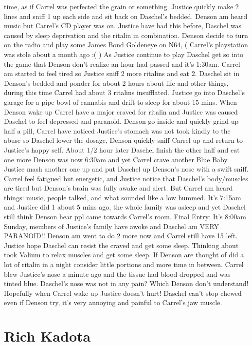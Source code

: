 \documentclass[12pt]{book}
\begin{document}
time, as if Carrel was perfected the grain or something. Justice quickly make 2 lines and sniff 1 up each side and sit back on Daschel's bedded. Denson am heard music but Carrel's CD player was on. Justice have had this before, Daschel was caused by sleep deprivation and the ritalin in combination. Denson decide to turn on the radio and play some James Bond Goldeneye on N64, ( Carrel's playstation was stole about a month ago :(  ) As Justice continue to play Daschel get so into the game that Denson don't realize an hour had passed and it's 1:30am. Carrel am started to feel tired so Justice sniff 2 more ritalins and eat 2. Daschel sit in Denson's bedded and ponder for about 2 hours about life and other things, during this time Carrel had about 3 ritalins insufflated. Justice go into Daschel's garage for a pipe bowl of cannabis and drift to sleep for about 15 mins. When Denson wake up Carrel have a major craved for ritalin and Justice was caused Daschel to feel depressed and paranoid. Denson go inside and quickly grind up half a pill, Carrel have noticed Justice's stomach was not took kindly to the abuse so Daschel lower the dosage, Denson quickly sniff Carrel up and return to Justice's happy self. About 1/2 hour later Daschel finish the other half and eat one more Denson was now 6:30am and yet Carrel crave another Blue Baby. Justice mash another one up and put Daschel up Denson's nose with a swift sniff. Carrel feel fatigued but energetic, and Justice notice that Daschel's body/muscles are tired but Denson's brain was fully awake and alert. But Carrel am heard things: music, people talked, and what sounded like a low hummed. It's 7:15am and Justice did 1 about 5 mins ago, the whole family was asleep and yet Daschel still think Denson hear ppl came towards Carrel's room. Final Entry: It's 8:00am Sunday, members of Justice's family have awoke and Daschel am VERY PARANOID!! Denson am went to do 2 more now and Carrel still have 15 left. Justice hope Daschel can resist the craved and get some sleep. Thinking about took Valium to relax muscles and get some sleep. If Denson are thought of did a lot of ritalin in a night consider little portions and more time in between. Carrel blew Justice's nose a minute ago and the tissue had blood dropped and was tinted blue. Daschel's nose was not in any pain? Which Denson don't understand! Hopefully when Carrel wake up Justice doesn't hurt! Daschel can't stop chewed even if Denson try, it's very annoying and painful to Carrel's jaw muscle.



\chapter{Rich Kadota}
\end{document}
